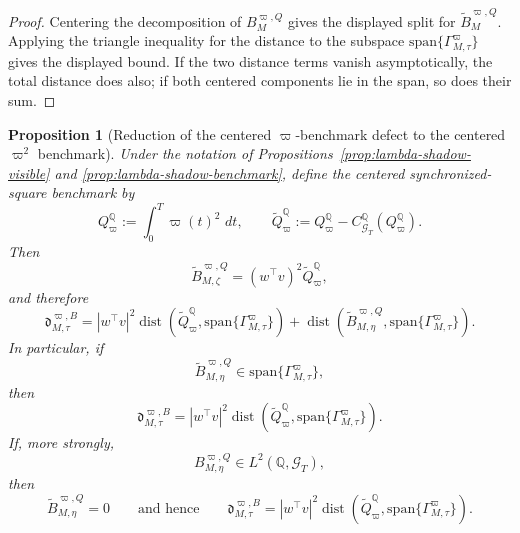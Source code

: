 \documentclass[11pt,a4paper]{amsart}
\theoremstyle{plain}
\newtheorem{proposition}[theorem]{Proposition}
\theoremstyle{definition}
\theoremstyle{remark}
\DeclareMathOperator{\dist}{dist}
\newcommand{\QQ}{\mathbb{Q}}
\newcommand{\cG}{\mathcal{G}}
\newcommand{\dd}{\,d}
\begin{document}
\begin{proof}
Centering the decomposition of \(B_{M}^{\varpi,Q}\) gives the displayed split for
\(\widetilde B_{M}^{\varpi,Q}\).  Applying the triangle inequality for the distance to the subspace
\(\mathrm{span}\{\Gamma_{M,\tau}^\varpi\}\) gives the displayed bound.  If the two distance terms
vanish asymptotically, the total distance does also; if both centered components lie in the span,
so does their sum.
\end{proof}

\begin{proposition}[Reduction of the centered \(\varpi\)-benchmark defect to the centered \(\varpi^2\) benchmark]\label{prop:lambda-shadow-lambda-square}
Under the notation of Propositions~\ref{prop:lambda-shadow-visible} and
\ref{prop:lambda-shadow-benchmark}, define the centered synchronized-square benchmark by
\[
        Q_{\varpi}^\QQ
        :=
        \int_0^T \varpi(t)^2\,\dd t,
        \qquad
        \widetilde Q_{\varpi}^\QQ
        :=
        Q_{\varpi}^\QQ-C_{\cG_T}^\QQ(Q_{\varpi}^\QQ).
\]
Then
\[
        \widetilde B_{M,\zeta}^{\varpi,Q}
        =
        (w^\top v)^2\widetilde Q_{\varpi}^\QQ,
\]
and therefore
\[
        \mathfrak d_{M,\tau}^{\varpi,B}
        =
        |w^\top v|^2
        \dist\!\left(
                \widetilde Q_{\varpi}^\QQ,
                \mathrm{span}\{\Gamma_{M,\tau}^\varpi\}
        \right)
        +
        \dist\!\left(
                \widetilde B_{M,\eta}^{\varpi,Q},
                \mathrm{span}\{\Gamma_{M,\tau}^\varpi\}
        \right).
\]
In particular, if
\[
        \widetilde B_{M,\eta}^{\varpi,Q}\in \mathrm{span}\{\Gamma_{M,\tau}^\varpi\},
\]
then
\[
        \mathfrak d_{M,\tau}^{\varpi,B}
        =
        |w^\top v|^2
        \dist\!\left(
                \widetilde Q_{\varpi}^\QQ,
                \mathrm{span}\{\Gamma_{M,\tau}^\varpi\}
        \right).
\]
If, more strongly,
\[
        B_{M,\eta}^{\varpi,Q}\in L^2(\QQ,\cG_T),
\]
then
\[
        \widetilde B_{M,\eta}^{\varpi,Q}=0
        \qquad
        \text{and hence}\qquad
        \mathfrak d_{M,\tau}^{\varpi,B}
        =
        |w^\top v|^2
        \dist\!\left(
                \widetilde Q_{\varpi}^\QQ,
                \mathrm{span}\{\Gamma_{M,\tau}^\varpi\}
        \right).
\]
\end{proposition}
\end{document}
